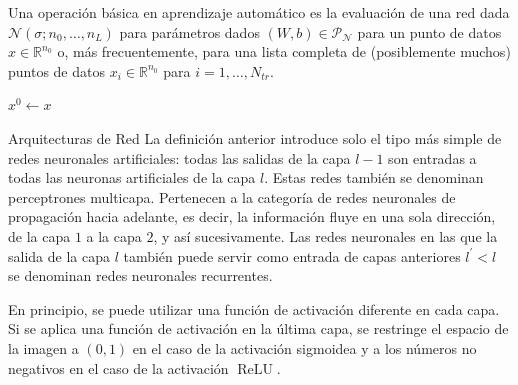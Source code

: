 \begin{frame}
    Una operación básica en aprendizaje automático es la evaluación de
    una red dada $\mathcal{N}\left(\sigma;n_{0},\dotsc,n_{L}\right)$
    para parámetros dados
    $\left(W,b\right)\in\mathcal{P}_{\mathcal{N}}$ para un punto de
    datos $x\in\mathbb{R}^{n_{0}}$ o, más frecuentemente, para una
    lista completa de (posiblemente muchos) puntos de datos
    $x_{i}\in\mathbb{R}^{n_{0}}$ para $i=1,\dotsc,N_{tr}$.

    \begin{algorithm}[H]
        $x^{0}\leftarrow x$\;
    \end{algorithm}

    \begin{alertblock}{Arquitecturas de Red}
        La definición anterior introduce solo el tipo más simple de redes
        neuronales artificiales: todas las salidas de la capa $l-1$ son
        entradas a todas las neuronas artificiales de la capa $l$.
        Estas redes también se denominan \alert{perceptrones multicapa}.
        Pertenecen a la categoría de
        \alert{redes neuronales de propagación hacia adelante}, es
        decir, la información fluye en una sola
        dirección, de la capa $1$ a la capa $2$, y así sucesivamente.
        Las redes neuronales en las que la salida de la capa $l$ también
        puede servir como entrada de capas anteriores $l^{\prime}<l$ se
        denominan \alert{redes neuronales recurrentes}.
    \end{alertblock}

    \pause

    En principio, se puede utilizar una función de activación
    diferente en cada capa.
    Si se aplica una función de activación en la última capa, se
    restringe el espacio de la imagen a $\left(0,1\right)$ en el caso
    de la activación sigmoidea y a los números no negativos en el
    caso de la activación $\operatorname{ReLU}$.
\end{frame}

